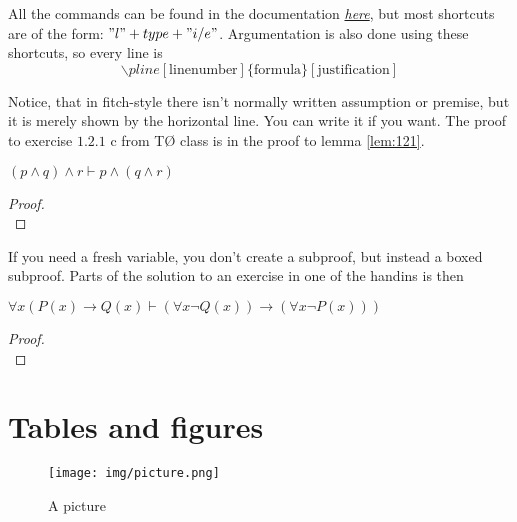 \documentclass[a4, english]{article}
\begin{document}
All the commands can be found in the documentation
\href{http://mirrors.dotsrc.org/ctan/macros/latex/contrib/lplfitch/lplfitch.pdf}{\emph{here}},
but most shortcuts are of the form: $"l" + type + "i/e"$. Argumentation is also
done using these shortcuts, so every line is
\begin{equation*}
    \backslash pline[\text{linenumber}]\{\text{formula}\}[\text{justification}]
\end{equation*}

Notice, that in fitch-style there isn't normally written assumption or premise,
but it is merely shown by the horizontal line. You can write it if you want. The
proof to exercise $1.2.1$ c from TØ class is in the proof to lemma
\ref{lem:121}.
\begin{lemma} \label{lem:121}
    $(p \wedge q) \wedge r \vdash p \wedge (q \wedge r)$
\end{lemma}
\begin{proof}
     \\ %
\end{proof}

If you need a fresh variable, you don't create a subproof, but instead a boxed
subproof. Parts of the solution to an exercise in one of the handins is then
\begin{theorem} \label{thm:handin}
    $\forall x (P(x) \rightarrow Q(x) \vdash (\forall x \neg Q(x)) \rightarrow (\forall x \neg P(x)))$
\end{theorem}
\begin{proof}
     \\ %
\end{proof}

\section{Tables and figures}
\begin{figure}[ht!] %
  \centering
  \texttt{[image: img/picture.png]}
  \caption{A picture}
  \label{FigExample}
\end{figure}
\end{document}
